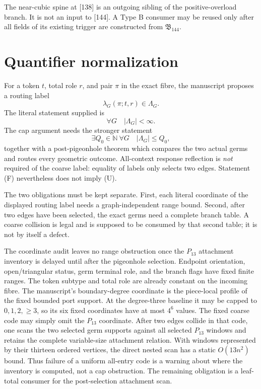\documentclass[11pt]{article}
\begin{document}
The near-cubic spine at [138] is an outgoing sibling of the positive-overload
branch.  It is not an input to [144].  A Type B consumer may be reused only
after all fields of its existing trigger are constructed from
$\mathfrak B_{144}$.

\section{Quantifier normalization}

For a token $t$, total role $r$, and pair $\pi$ in the exact fibre, the
manuscript proposes a routing label
\[
 \lambda_G(\pi;t,r)\in\Lambda_G.
\]
The literal statement supplied is
\[
 \forall G\quad |\Lambda_G|<\infty.                             \tag{F}
\]
The cap argument needs the stronger statement
\[
 \exists Q_0\in\mathbb N\ \forall G\quad |\Lambda_G|\le Q_0,   \tag{U}
\]
together with a post-pigeonhole theorem which compares the two actual germs
and routes every geometric outcome.  All-context response reflection is
\emph{not} required of the coarse label: equality of labels only selects two
edges.  Statement (F) nevertheless does not imply (U).

The two obligations must be kept separate.  First, each literal coordinate
of the displayed routing label needs a graph-independent range bound.  Second,
after two edges have been selected, the exact germs need a complete branch
table.  A coarse collision is legal and is supposed to be consumed by that
second table; it is not by itself a defect.

The coordinate audit leaves no range obstruction once the $P_{13}$ attachment
inventory is delayed until after the pigeonhole selection.  Endpoint
orientation, open/triangular status, germ terminal role, and the branch flags
have fixed finite ranges.  The token subtype and total role are already
constant on the incoming fibre.  The manuscript's boundary-degree coordinate
is the piece-local profile of the fixed bounded port support.  At the
degree-three baseline it may be capped to $0,1,2,{\ge}3$, so its six fixed
coordinates have at most $4^6$ values.  The fixed coarse code may simply omit
the $P_{13}$ coordinate.  After two edges collide in that code, one scans the
two selected germ supports against all selected $P_{13}$ windows and retains
the complete variable-size attachment relation.  With windows represented by
their thirteen ordered vertices, the direct nested scan has a static
$O(13n^2)$ bound.  Thus failure of a uniform all-entry code is a warning about
where the inventory is computed, not a cap obstruction.  The remaining
obligation is a leaf-total consumer for the post-selection attachment scan.
\end{document}
